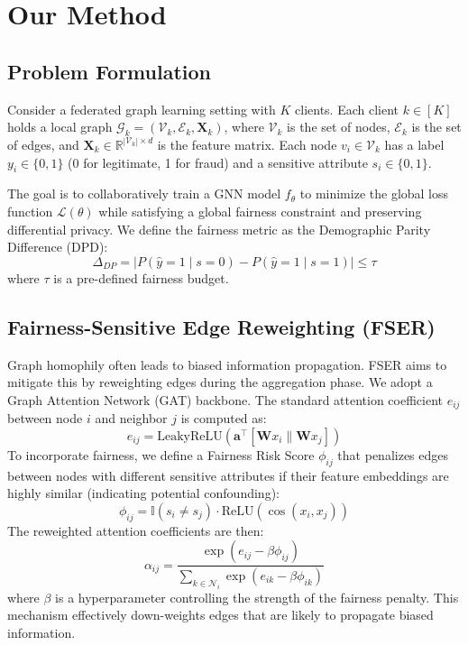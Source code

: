 \documentclass[pmlr]{jmlr}%
\begin{document}
\section{Our Method}
\label{sec:method}

\subsection{Problem Formulation}
Consider a federated graph learning setting with $K$ clients. Each client $k \in [K]$ holds a local graph $\mathcal{G}_k = (\mathcal{V}_k, \mathcal{E}_k, \mathbf{X}_k)$, where $\mathcal{V}_k$ is the set of nodes, $\mathcal{E}_k$ is the set of edges, and $\mathbf{X}_k \in \mathbb{R}^{|\mathcal{V}_k| \times d}$ is the feature matrix. Each node $v_i \in \mathcal{V}_k$ has a label $y_i \in \{0,1\}$ (0 for legitimate, 1 for fraud) and a sensitive attribute $s_i \in \{0,1\}$.

The goal is to collaboratively train a GNN model $f_\theta$ to minimize the global loss function $\mathcal{L}(\theta)$ while satisfying a global fairness constraint and preserving differential privacy. We define the fairness metric as the Demographic Parity Difference (DPD):
\begin{equation}
\Delta_{DP} = |P(\hat{y}=1 \mid s=0) - P(\hat{y}=1 \mid s=1)| \le \tau
\label{eq:dpd}
\end{equation}
where $\tau$ is a pre-defined fairness budget.

\subsection{Fairness-Sensitive Edge Reweighting (FSER)}
Graph homophily often leads to biased information propagation. FSER aims to mitigate this by reweighting edges during the aggregation phase. We adopt a Graph Attention Network (GAT) backbone. The standard attention coefficient $e_{ij}$ between node $i$ and neighbor $j$ is computed as:
\begin{equation}
e_{ij} = \text{LeakyReLU}(\mathbf{a}^\top[\mathbf{W}x_i \| \mathbf{W}x_j])
\label{eq:gat_attn}
\end{equation}
To incorporate fairness, we define a Fairness Risk Score $\phi_{ij}$ that penalizes edges between nodes with different sensitive attributes if their feature embeddings are highly similar (indicating potential confounding):
\begin{equation}
\phi_{ij} = \mathbb{I}(s_i \ne s_j) \cdot \text{ReLU}(\cos(x_i, x_j))
\label{eq:fser_risk}
\end{equation}
The reweighted attention coefficients are then:
\begin{equation}
\alpha_{ij} = \frac{\exp(e_{ij} - \beta \phi_{ij})}{\sum_{k \in \mathcal{N}_i} \exp(e_{ik} - \beta \phi_{ik})}
\label{eq:fser_attn}
\end{equation}
where $\beta$ is a hyperparameter controlling the strength of the fairness penalty. This mechanism effectively down-weights edges that are likely to propagate biased information.
\end{document}
